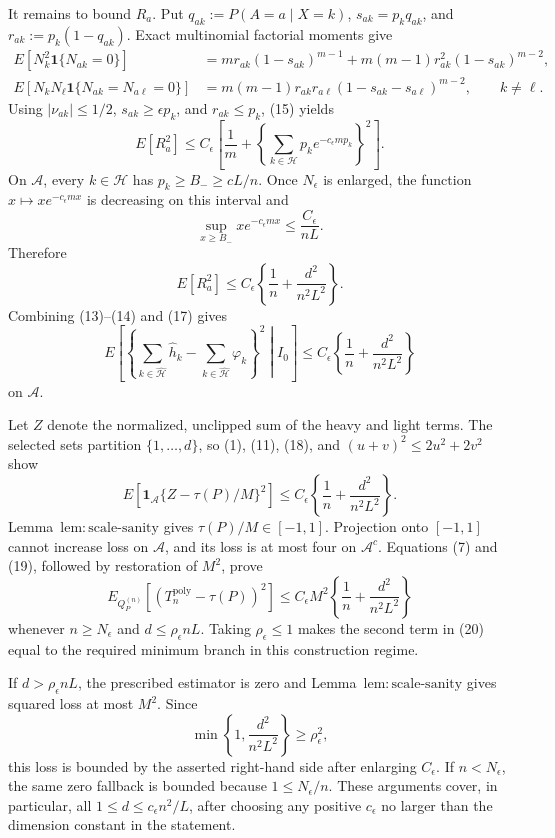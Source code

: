 It remains to bound \(R_a\).  Put \(q_{ak}:=P(A=a\mid X=k)\), \(s_{ak}=p_kq_{ak}\), and \(r_{ak}:=p_k(1-q_{ak})\).  Exact multinomial factorial moments give
\[
 \begin{split}
 E[N_k^2\mathbf1\{N_{ak}=0\}]
 &=mr_{ak}(1-s_{ak})^{m-1}
 +m(m-1)r_{ak}^2(1-s_{ak})^{m-2},\\
 E[N_kN_\ell\mathbf1\{N_{ak}=N_{a\ell}=0\}]
 &=m(m-1)r_{ak}r_{a\ell}
 (1-s_{ak}-s_{a\ell})^{m-2},\qquad k\ne\ell.
 \end{split}
\tag{15}
\]
Using \(|\nu_{ak}|\le1/2\), \(s_{ak}\ge\epsilon p_k\), and \(r_{ak}\le p_k\), (15) yields
\[
 E[R_a^2]
 \le C_\epsilon\left[\frac1m+
 \left\{\sum_{k\in\mathcal H}p_k e^{-c_\epsilon mp_k}\right\}^2\right].
\tag{16}
\]
On \(\mathcal A\), every \(k\in\mathcal H\) has \(p_k\ge B_-\ge cL/n\).  Once \(N_\epsilon\) is enlarged, the function \(x\mapsto xe^{-c_\epsilon mx}\) is decreasing on this interval and
\[
 \sup_{x\ge B_-}xe^{-c_\epsilon mx}
 \le \frac{C_\epsilon}{nL}.
\]
Therefore
\[
 E[R_a^2]\le C_\epsilon\left\{\frac1n+\frac{d^2}{n^2L^2}\right\}.
\tag{17}
\]
Combining (13)--(14) and (17) gives
\[
 E\left[\left\{
 \sum_{k\in\widehat{\mathcal H}}\widehat h_k
 -\sum_{k\in\widehat{\mathcal H}}\varphi_k
 \right\}^2\middle|I_0\right]
 \le C_\epsilon\left\{\frac1n+\frac{d^2}{n^2L^2}\right\}
\tag{18}
\]
on \(\mathcal A\).

Let \(Z\) denote the normalized, unclipped sum of the heavy and light terms.  The selected sets partition \(\{1,\ldots,d\}\), so (1), (11), (18), and \((u+v)^2\le2u^2+2v^2\) show
\[
 E[\mathbf1_{\mathcal A}\{Z-\tau(P)/M\}^2]
 \le C_\epsilon\left\{\frac1n+\frac{d^2}{n^2L^2}\right\}.
\tag{19}
\]
Lemma~\(\mathrm{lem:scale\text{-}sanity}\) gives \(\tau(P)/M\in[-1,1]\).  Projection onto \([-1,1]\) cannot increase loss on \(\mathcal A\), and its loss is at most four on \(\mathcal A^c\).  Equations (7) and (19), followed by restoration of \(M^2\), prove
\[
 E_{Q_P^{(n)}}[(T_n^{\mathrm{poly}}-\tau(P))^2]
 \le C_\epsilon M^2\left\{\frac1n+\frac{d^2}{n^2L^2}\right\}
\tag{20}
\]
whenever \(n\ge N_\epsilon\) and \(d\le\rho_\epsilon nL\).  Taking \(\rho_\epsilon\le1\) makes the second term in (20) equal to the required minimum branch in this construction regime.

If \(d>\rho_\epsilon nL\), the prescribed estimator is zero and Lemma~\(\mathrm{lem:scale\text{-}sanity}\) gives squared loss at most \(M^2\).  Since
\[
 \min\left\{1,\frac{d^2}{n^2L^2}\right\}\ge\rho_\epsilon^2,
\]
this loss is bounded by the asserted right-hand side after enlarging \(C_\epsilon\).  If \(n<N_\epsilon\), the same zero fallback is bounded because \(1\le N_\epsilon/n\).  These arguments cover, in particular, all \(1\le d\le c_\epsilon n^2/L\), after choosing any positive \(c_\epsilon\) no larger than the dimension constant in the statement.

